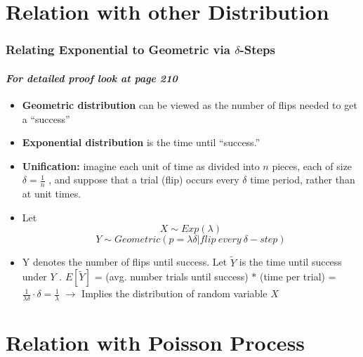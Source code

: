 \documentclass{beamer}
\begin{document}
\section{Relation with other Distribution}

\begin{frame} 
\frametitle{Relating Exponential to Geometric via $\delta$-Steps}
\framesubtitle{\textbf{\textit{For detailed proof look at page 210}}}
\begin{itemize}
\item \textbf{Geometric distribution} can be viewed as the number of flips needed to get a ``success'' 
\item \textbf{Exponential distribution } is the time until “success.”
\item \textbf{Unification:} imagine each unit of time
as divided into $n$ pieces, each of size $\delta = \frac{1}{n}$ , and suppose that a trial (flip) occurs every $\delta$ time period, rather than at unit times.

\item Let $$X \sim Exp(\lambda)$$
$$Y \sim Geometric(p = \lambda \delta | flip \: every \: \delta -step)$$

\item Y denotes the number of flips until success. Let $\tilde{Y}$ is  the time until success under $Y$ .
$E[\tilde{Y}] $ = (avg. number trials until success) $*$ (time per trial) = 
$\frac{1}{\lambda \delta} \cdot \delta = \frac{1}{\lambda }$ 
$\rightarrow $ Implies the distribution of random variable  $X$

\end{itemize}
	
\end{frame}



\section{Relation with Poisson Process}
\end{document}
